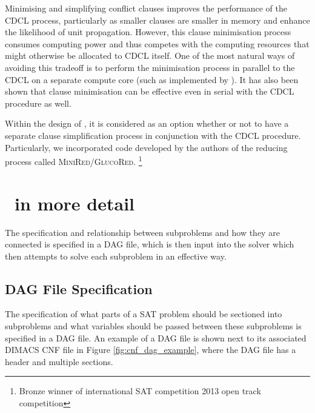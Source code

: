 \documentclass[
10pt, %
a4paper, %
oneside, %
headinclude,footinclude, %
BCOR5mm, %
]{scrartcl}
\begin{document}
Minimising and simplifying conflict clauses improves the performance of the CDCL process, particularly as smaller clauses are smaller in memory and enhance the likelihood of unit propagation.
However, this clause minimisation process consumes computing power and thus competes with the computing resources that might otherwise be allocated to CDCL itself.
One of the most natural ways of avoiding this tradeoff is to perform the minimisation process in parallel to the CDCL on a separate compute core (such as implemented by \cite{DBLP:conf/sat/WieringaH13}). It has also been shown that clause minimisation can be effective even in serial with the CDCL procedure as well.\cite{ijcai2017-98}

Within the design of \dagster, it is considered as an option whether or not to have a separate clause simplification process in conjunction with the CDCL procedure.
Particularly, we incorporated code developed by the authors of \cite{DBLP:conf/sat/WieringaH13} the reducing process called \textsc{MiniRed/GlucoRed}. 
\footnote{Bronze winner of international SAT competition 2013 open track competition}


\section{\dagster\ in more detail}\label{sec:dagster_structure_composition}

The specification and relationship between subproblems and how they are connected is specified in a DAG file, which is then input into the solver which then attempts to solve each subproblem in an effective way.

\subsection{DAG File Specification}\label{sec:dag_file}

The specification of what parts of a SAT problem should be sectioned into subproblems and what variables should be passed between these subproblems is specified in a DAG file.
An example of a DAG file is shown next to its associated DIMACS CNF file in Figure \ref{fig:cnf_dag_example}, where the DAG file has a header and multiple sections.
\end{document}
